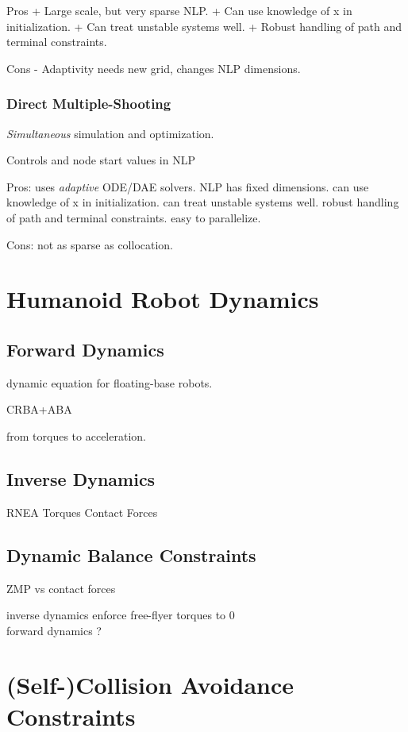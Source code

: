 Pros
+ Large scale, but very sparse NLP.
+ Can use knowledge of x in initialization.
+ Can treat unstable systems well.
+ Robust handling of path and terminal constraints.

Cons
- Adaptivity needs new grid, changes NLP dimensions.

\subsubsection{Direct Multiple-Shooting}

\emph{Simultaneous} simulation and optimization.

Controls and node start values in NLP

Pros:
uses \emph{adaptive} ODE/DAE solvers.
NLP has ﬁxed dimensions.
can use knowledge of x in initialization.
can treat unstable systems well.
robust handling of path and terminal constraints.
easy to parallelize.

Cons:
not as sparse as collocation.

\section{Humanoid Robot Dynamics}

\subsection{Forward Dynamics}

dynamic equation for floating-base robots.

CRBA+ABA

from torques to acceleration.

\subsection{Inverse Dynamics}

RNEA
Torques
Contact Forces

\subsection{Dynamic Balance Constraints}

ZMP vs contact forces

inverse dynamics  enforce free-flyer torques to 0 \\
forward dynamics  ?

\section{(Self-)Collision Avoidance Constraints}

